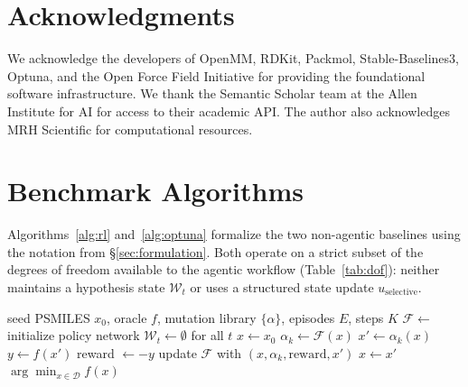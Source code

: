 \documentclass[twocolumn]{fairmeta}
\begin{document}
\section{Acknowledgments}

We acknowledge the developers of OpenMM, RDKit, Packmol, Stable-Baselines3, Optuna, and the Open Force Field Initiative for providing the foundational software infrastructure.
We thank the Semantic Scholar team at the Allen Institute for AI for access to their academic API.
The author also acknowledges MRH Scientific for computational resources.




\appendix

\section{Benchmark Algorithms}
\label{app:algorithms}

Algorithms~\ref{alg:rl} and~\ref{alg:optuna} formalize the two non-agentic baselines using the notation from \S\ref{sec:formulation}.
Both operate on a strict subset of the degrees of freedom available to the agentic workflow (Table~\ref{tab:dof}): neither maintains a hypothesis state $\mathcal{W}_t$ or uses a structured state update $u_\text{selective}$.

\begin{algorithm}[H]
\caption{RL Polymer Discovery (DQN / PPO)}\label{alg:rl}
\small
\begin{algorithmic}[1]
\Require seed PSMILES $x_0$, oracle $f$, mutation library $\{\alpha\}$, episodes $E$, steps $K$
\State $\mathcal{F} \gets$ initialize policy network 
\State $\mathcal{W}_t \gets \emptyset$ for all $t$ 
  \State $x \gets x_0$
    \State $\alpha_k \gets \mathcal{F}(x)$ 
    \State $x' \gets \alpha_k(x)$ 
    \State $y \gets f(x')$ 
    \State reward $\gets -y$
    \State update $\mathcal{F}$ with $(x, \alpha_k, \text{reward}, x')$
    \State $x \gets x'$
  \EndFor
\EndFor
\State \Return $\arg\min_{x \in \mathcal{D}} f(x)$
\end{algorithmic}
\end{algorithm}
\end{document}
